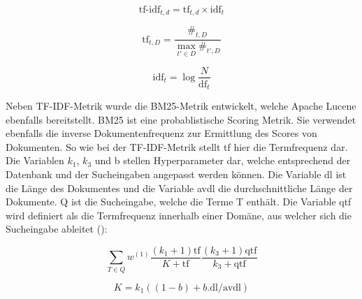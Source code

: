\[\text{tf-idf}_{t,d}=\text{tf}_{t,d} \times \text{idf}_t\]

\[\text{tf}_{t,D}=\frac {\#_{t,D}}{\max _{t'\in D}\#_{t',D}}\]

\[\text{idf}_t=\log {\frac {N}{\text{df}_t}}\]

Neben TF-IDF-Metrik wurde die BM25-Metrik entwickelt, welche Apache Lucene ebenfalls bereitstellt.
BM25 ist eine probablistische Scoring Metrik.
Sie verwendet ebenfalls die inverse Dokumentenfrequenz zur Ermittlung des Scores von Dokumenten.
So wie bei der TF-IDF-Metrik stellt tf hier die Termfrequenz dar.
Die Variablen \(k_1\), \(k_3\) und b stellen Hyperparameter dar, welche entsprechend der Datenbank und der Sucheingaben angepasst werden können.
Die Variable dl ist die Länge des Dokumentes und die Variable avdl die durchschnittliche Länge der Dokumente.
Q ist die Sucheingabe, welche die Terme T enthält.
Die Variable qtf wird definiert als die Termfrequenz innerhalb einer Domäne, aus welcher sich die Sucheingabe ableitet (\cite{Beaulieu_Track_Sparck_Karen_Willett_Peter}):

\[\sum_{T \in Q}w^{(1)} \frac{(k_1 + 1)\text{tf}}{K + \text{tf}} \frac{(k_3 + 1)\text{qtf}}{k_3 + \text{qtf}}\]

\[K=k_1((1 - b) + b.\text{dl} / \text{avdl})\]

